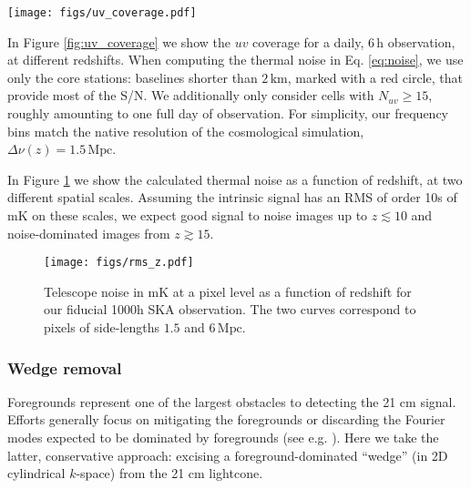 \documentclass[fleqn,usenatbib]{mnras}
\begin{document}
\begin{figure*}
    \centering
    \texttt{[image: figs/uv\_coverage.pdf]}
    \caption{Daily $uv$ coverage at different redshifts (frequencies). The red circle denotes the maximum baselines considered when computing the noise ($2 \, \mathrm{km}$). $N_{uv}$ represents the number of  measurements in a given $uv$ cell, for $t_\mathrm{obs} = 6 \, \mathrm{h}$, $t_\mathrm{int} = 10 \, \mathrm{s}$.}
    \label{fig:uv_coverage}
\end{figure*}

In Figure \ref{fig:uv_coverage} we show the $uv$ coverage for a daily, $6\,\mathrm{h}$ observation, at different redshifts. When computing the thermal noise in Eq. \ref{eq:noise}, we use only the core stations: baselines shorter than $2 \, \mathrm{km}$, marked with a red circle, that provide most of the S/N.  We additionally only consider cells with $N_{uv} \geq 15$, roughly amounting to one full day of observation.  For simplicity, our frequency bins match the native resolution of the cosmological simulation, $\Delta\nu(z) = 1.5 \, \mathrm{Mpc}$.

In Figure \ref{fig:rms_z} we show the calculated thermal noise as a function of redshift, at two different spatial scales.   Assuming the intrinsic signal has an RMS of order 10s of mK on these scales, we expect good signal to noise images up to $z\lesssim10$ and noise-dominated images from $z\gtrsim15$.
\begin{figure}
    \centering
    \texttt{[image: figs/rms\_z.pdf]}
    \caption{Telescope noise in $\mathrm{mK}$ at a pixel level as a function of redshift for our fiducial 1000h SKA observation. The two curves correspond to pixels of side-lengths $1.5$ and $6 \, \mathrm{Mpc}$.}
    \label{fig:rms_z}
\end{figure}

\subsubsection{Wedge removal}
Foregrounds represent one of the largest obstacles to detecting the 21 cm signal. 
Efforts generally focus on mitigating the foregrounds or discarding the Fourier modes expected to be dominated by foregrounds (see e.g. \citealt{kerrigan2018improved,chapman2019foregrounds}). 
Here we take the latter, conservative approach: excising a foreground-dominated \enquote{wedge} (in 2D cylindrical $k$-space) from the 21 cm lightcone.
\end{document}
